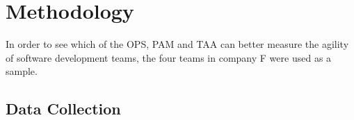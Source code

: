 %
%


\section{Methodology}
In order to see which of the OPS, PAM and TAA can better measure the agility of software development teams, the four teams in company F were used as a sample.

\subsection{Data Collection}


